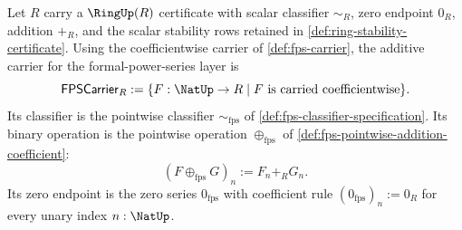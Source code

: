 \begin{definition}
\label{def:fps-pointwise-additive-monoid-instance}
Let $R$ carry a $\RingUp(R)$ certificate with scalar classifier $\sim_R$, zero endpoint $0_R$, addition $+_R$, and the scalar stability rows retained in \autoref{def:ring-stability-certificate}. Using the coefficientwise carrier of \autoref{def:fps-carrier}, the additive carrier for the formal-power-series layer is
$$
\mathsf{FPSCarrier}_R:=\{F:\NatUp\to R\mid F\text{ is carried coefficientwise}\}.
$$
Its classifier is the pointwise classifier $\sim_{\mathrm{fps}}$ of \autoref{def:fps-classifier-specification}. Its binary operation is the pointwise operation $\oplus_{\mathrm{fps}}$ of \autoref{def:fps-pointwise-addition-coefficient}:
$$
(F\oplus_{\mathrm{fps}}G)_n:=F_n+_R G_n.
$$
Its zero endpoint is the zero series $0_{\mathrm{fps}}$ with coefficient rule $(0_{\mathrm{fps}})_n:=0_R$ for every unary index $n:\NatUp$.
\end{definition}

